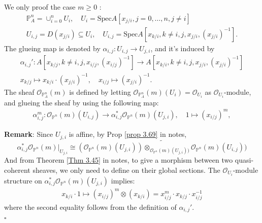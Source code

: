 \documentclass{article}
\newenvironment{Proof}{{\noindent \indent \it Proof:\quad}}{\hfill $\square$\par}
\begin{document}
\begin{Proof} We only proof the case $m\geq 0$ :
\begin{align*}
    \mathbb{P}_A^n = \cup_{i=0}^n U_i, \quad 
    U_i = \text{Spec} A[x_{j/i}, j=0,\dots,n, j\neq i]\\
    U_{i,j} = D(x_{j/i}) \subseteq U_i, \quad 
    U_{i,j} = \text{Spec} A[x_{k/i}, k\neq i,j , x_{j/i}, (x_{j/i})^{-1}].
\end{align*}
The glueing map is denoted by $\alpha_{i,j} : U_{i,j} \rightarrow U_{j,i}$, and it's induced by 
\begin{align*}
    \alpha_{i,j}': A[x_{k/j}, k \neq i,j , x_{i/j}, (x_{i/j})^{-1}] \rightarrow A[x_{k/i}, k\neq i,j , x_{j/i}, (x_{j/i})^{-1}]\\
    x_{k/j} \mapsto x_{k/i}\cdot (x_{j/i})^{-1}, 
    \quad x_{i/j} \mapsto (x_{j/i})^{-1}.
\end{align*}
The sheaf $\mathcal{O}_{\mathbb{P}_A^n}(m)$ is defined by letting $\mathcal{O}_{\mathbb{P}_A^n}(m)(U_{i}) = \mathcal{O}_{U_i}$ as $\mathcal{O}_{U_i}$-module, and glueing the sheaf by using the following map:
\begin{align*}
    \alpha_{i,j}^m : \mathcal{O}_{\mathbb{P}^n}(m)(U_{i,j}) \rightarrow \alpha_{i,j}^* \mathcal{O}_{\mathbb{P}^n}(m)(U_{j,i}), \quad
    1 \mapsto (x_{i/j})^m,
\end{align*}


\textbf{Remark}: 
Since $U_{j,i}$ is affine, by Prop \ref{prop 3.69} in notes, 
\begin{equation*}
 \alpha_{i,j}^*\mathcal{O}_{\mathbb{P}^n}(m)|_{U_{j,i}}
 \cong \widetilde{(\mathcal{O}_{\mathbb{P}^n}(m)(U_{j,i}))\otimes_{\mathcal{O}_{\mathbb{P}^n}(m)(U_{j,i}))}\mathcal{O}_{\mathbb{P}^n}(m)(U_{i,j}))
 }
\end{equation*}
And from Theorem \ref{Thm 3.45} in notes, to give a morphism between two quasi-coherent sheaves, we only need to define on their global sections. 
The $\mathcal{O}_{U_i}$-module structure on $\alpha_{i,j}^* \mathcal{O}_{\mathbb{P}^n}(m)(U_{j,i})$ 
implies:
\begin{align*}
    x_{k/i}\cdot 1 \mapsto (x_{i/j})^m \otimes (x_{k/i}) = x_{i/j}^m\cdot x_{k/j}\cdot x_{i/j}^{-1} 
\end{align*}
where the second equality follows from the definition of $\alpha_{i,j}'$.
\\



\end{Proof}
\end{document}
